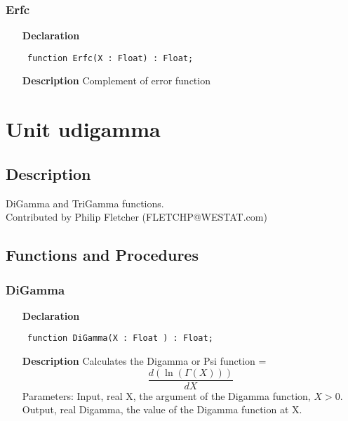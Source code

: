 \documentclass[12pt,a4paper,oneside]{report}
\newcommand{\declarationitem}[1]{\textbf{#1}}
\newcommand{\descriptiontitle}[1]{\textbf{#1}}
\newcommand{\code}[1]{\texttt{#1}}
\begin{document}
\subsubsection{Erfc}
\label{uigamma-Erfc}
\begin{itemize}\item[\declarationitem{Declaration}\hfill]
	\begin{flushleft}
		\code{
			function Erfc(X : Float) : Float;}
		
	\end{flushleft}
	
	\par
	\item[\descriptiontitle{Description}]
	Complement of error function
	
\end{itemize}
\section{Unit udigamma}
\label{udigamma}
\subsection{Description}
DiGamma and TriGamma functions. \\ Contributed by Philip Fletcher (FLETCHP@WESTAT.com) 
\subsection{Functions and Procedures}
\subsubsection{DiGamma}
\label{udigamma-DiGamma}
\begin{itemize}\item[\declarationitem{Declaration}\hfill]
	\begin{flushleft}
		\code{
			function DiGamma(X : Float ) : Float;}
		
	\end{flushleft}
	
	\par
	\item[\descriptiontitle{Description}]
	Calculates the Digamma or Psi function = 
	$$
	\frac{d(\ln(\Gamma(X)))}{dX}
	$$
	Parameters: Input, real X, the argument of the Digamma function, $X>0$. Output, real Digamma, the value of the Digamma function at X.
	
\end{itemize}
\end{document}
